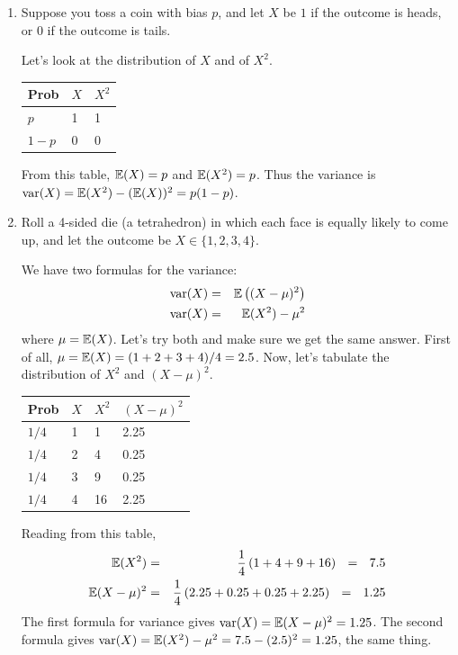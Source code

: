 \begin{enumerate}
\item Suppose you toss a coin with bias $p$, and let $X$ be $1$ if the outcome is heads, or 
$0$ if the outcome is tails.

Let's look at the distribution of $X$ and of $X^2$.

\begin{center}
\begin{tabular}{l|l|l}
Prob  & $X$ & $X^2$ \\ \hline
$p$   &  1  & 1     \\
$1-p$ &  0  & 0     
\end{tabular}
\end{center}

\noindent
From this table, $\mathbb{E}(X) = p$ and $\mathbb{E}(X^2) = p$. Thus the variance is 
$\mbox{\rm var}(X) = \mathbb{E}(X^2) - (\mathbb{E}(X))^2 = p(1-p)$.

\item Roll a 4-sided die (a tetrahedron) in which each face is equally likely to come
up, and let the outcome be $X \in \{1,2,3,4\}$.

We have two formulas for the variance: 
\begin{eqnarray*}
\mbox{\rm var}(X) & = & \mathbb{E} \left( (X - \mu)^2 \right) \\
\mbox{\rm var}(X) & = & \mathbb{E}(X^2) - \mu^2 
\end{eqnarray*}
where $\mu = \mathbb{E}(X)$.
Let's try both and make sure we get the same answer.
First of all, $\mu = \mathbb{E}(X) = (1 + 2 + 3 + 4)/4 = 2.5$. Now, let's tabulate the
distribution of $X^2$ and $(X-\mu)^2$.

\begin{center}
\begin{tabular}{l|l|l|l}
Prob  & $X$ & $X^2$ & $(X-\mu)^2$ \\ \hline
$1/4$ &  1  & 1     &  2.25 \\
$1/4$ &  2  & 4     &  0.25 \\
$1/4$ &  3  & 9     &  0.25 \\
$1/4$ &  4  & 16    &  2.25
\end{tabular}
\end{center}

\noindent
Reading from this table,
\begin{eqnarray*}
\E(X^2)     & = & \frac{1}{4} \left( 1 + 4 + 9 + 16 \right) \ \ = \ \ 7.5 \\
\E(X-\mu)^2 & = & \frac{1}{4} \left( 2.25 + 0.25 + 0.25 + 2.25 \right) \ \ = \ \ 1.25
\end{eqnarray*}
The first formula for variance gives $\mbox{\rm var}(X) = \mathbb{E}(X-\mu)^2 = 1.25$. The second
formula gives $\mbox{\rm var}(X) = \mathbb{E}(X^2) - \mu^2 = 7.5 - (2.5)^2 = 1.25$, the same thing.


\end{enumerate}
